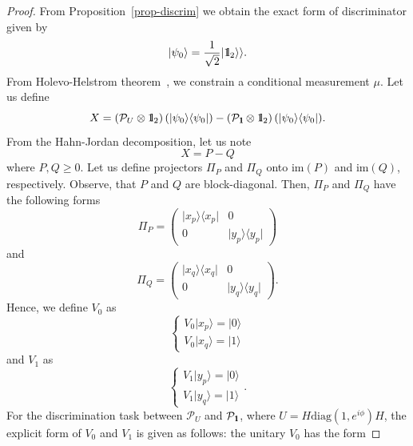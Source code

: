 \documentclass[preprint,12pt, a4paper, dvipsnames]{elsarticle}
\newcommand{\ket}[1]{\ensuremath{|#1\rangle}}
\newcommand{\bra}[1]{\ensuremath{\langle#1|}}
\newcommand{\ketbra}[2]{\ensuremath{\ket{#1}\bra{#2}}}
\newcommand{\proj}[1]{\ensuremath{\ketbra{#1}{#1}}}
\newcommand{\1}{{\rm 1\hspace{-0.9mm}l}}
\newcommand{\Id}{{\rm 1\hspace{-0.9mm}l}}
\newcommand{\PP}{\mathcal{P}}
\newcommand{\diag}{\mathrm{diag}}
\begin{document}
\begin{proof}
	From Proposition~\ref{prop-discrim} we obtain the exact form of discriminator given by
	\begin{equation}
	\ket{\psi_0}  = \frac{1}{\sqrt{2}} |\Id_2
	\rangle \rangle.
	\end{equation}
	From Holevo-Helstrom theorem~\cite{watrous}, we constrain a conditional measurement $\mu$.
	Let us define
	\begin{equation}
	X  = \left( \PP_U \otimes \Id_2 \right)(\proj{\psi_0}) -  \left( \PP_\Id
	\otimes \Id_2 \right)(\proj{\psi_0}).
	\end{equation}
	From the Hahn-Jordan decomposition, let us note
	\begin{equation}
	X = P - Q
	\end{equation}
	where $P, Q \ge 0 $.
	Let us define projectors $\Pi_P$ and $\Pi_Q$ onto  $\text{im}(P)$ and $\text{im}(Q)$,
	respectively. Observe, that $P $ and $Q$ are block-diagonal.  Then,  $\Pi_P$ and $\Pi_Q$ have the following forms
	\begin{equation}
	\Pi_P = \left(\begin{array}{cc}\proj{x_p}&0\\0&\proj{y_p}\end{array}\right)
	\end{equation}
	and
	\begin{equation}
	\Pi_Q = \left(\begin{array}{cc}\proj{x_q}&0\\0&\proj{y_q}\end{array}\right).
	\end{equation}
	Hence, we define $V_0$ as
	\begin{equation}
	\begin{cases} V_0 \ket{x_p} = \ket{0} \\ V_0 \ket{x_q} = \ket{1} \end{cases}
	\end{equation}
	and $V_1$ as
	\begin{equation}
	\begin{cases}
	V_1 \ket{y_p} = \ket{0} \\
	V_1 \ket{y_q} = \ket{1}
	\end{cases}.
	\end{equation}
	For the discrimination task between $\PP_{U}$ and $\PP_{\Id}$, where $U = H
	\diag(1, e^{i \phi })H$, the explicit form of $V_0$ and $V_1$ is given as
	follows: 
	the unitary $V_0$ has the form

\end{proof}
\end{document}
